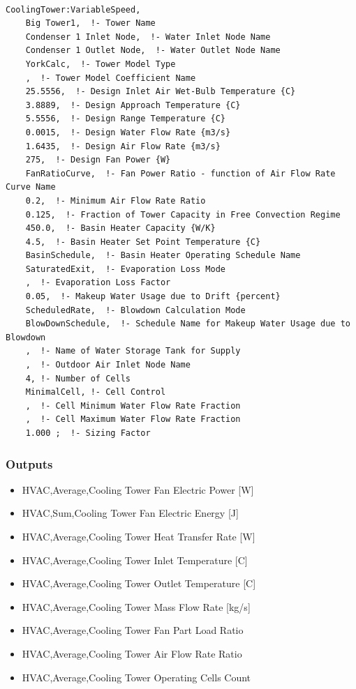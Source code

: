 \begin{lstlisting}

CoolingTower:VariableSpeed,
    Big Tower1,  !- Tower Name
    Condenser 1 Inlet Node,  !- Water Inlet Node Name
    Condenser 1 Outlet Node,  !- Water Outlet Node Name
    YorkCalc,  !- Tower Model Type
    ,  !- Tower Model Coefficient Name
    25.5556,  !- Design Inlet Air Wet-Bulb Temperature {C}
    3.8889,  !- Design Approach Temperature {C}
    5.5556,  !- Design Range Temperature {C}
    0.0015,  !- Design Water Flow Rate {m3/s}
    1.6435,  !- Design Air Flow Rate {m3/s}
    275,  !- Design Fan Power {W}
    FanRatioCurve,  !- Fan Power Ratio - function of Air Flow Rate Curve Name
    0.2,  !- Minimum Air Flow Rate Ratio
    0.125,  !- Fraction of Tower Capacity in Free Convection Regime
    450.0,  !- Basin Heater Capacity {W/K}
    4.5,  !- Basin Heater Set Point Temperature {C}
    BasinSchedule,  !- Basin Heater Operating Schedule Name
    SaturatedExit,  !- Evaporation Loss Mode
    ,  !- Evaporation Loss Factor
    0.05,  !- Makeup Water Usage due to Drift {percent}
    ScheduledRate,  !- Blowdown Calculation Mode
    BlowDownSchedule,  !- Schedule Name for Makeup Water Usage due to Blowdown
    ,  !- Name of Water Storage Tank for Supply
    ,  !- Outdoor Air Inlet Node Name
    4, !- Number of Cells
    MinimalCell, !- Cell Control
    ,  !- Cell Minimum Water Flow Rate Fraction
    ,  !- Cell Maximum Water Flow Rate Fraction
    1.000 ;  !- Sizing Factor
\end{lstlisting}

\subsubsection{Outputs}\label{outputs-3-001}

\begin{itemize}
\item
  HVAC,Average,Cooling Tower Fan Electric Power {[}W{]}
\item
  HVAC,Sum,Cooling Tower Fan Electric Energy {[}J{]}
\item
  HVAC,Average,Cooling Tower Heat Transfer Rate {[}W{]}
\item
  HVAC,Average,Cooling Tower Inlet Temperature {[}C{]}
\item
  HVAC,Average,Cooling Tower Outlet Temperature {[}C{]}
\item
  HVAC,Average,Cooling Tower Mass Flow Rate {[}kg/s{]}
\item
  HVAC,Average,Cooling Tower Fan Part Load Ratio
\item
  HVAC,Average,Cooling Tower Air Flow Rate Ratio
\item
  HVAC,Average,Cooling Tower Operating Cells Count
\end{itemize}

